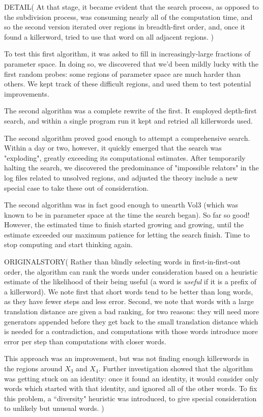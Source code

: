 \begin{itemize}
DETAIL(
At that stage, it became evident that the search process, as 
opposed to the subdivision process, 
was consuming nearly all of the computation time, and so the second 
version iterated over regions in breadth-first order, and, once it 
found a killerword, tried to use that word on all adjacent regions.
)

To test this first algorithm, it was asked to fill in increasingly-large fractions of parameter space. In doing so, we discovered that we'd been mildly lucky with the first random probes: some regions of parameter space are much harder than others. We kept track of these difficult regions, and used them to test potential improvements.

The second algorithm was a complete rewrite of the first. It employed depth-first search, and within a single program run it kept and retried all killerwords used.

The second algorithm proved good enough to attempt a comprehensive search. Within a day or two, however, it quickly emerged that the search was "exploding", greatly exceeding its computational estimates. After temporarily halting the search, we discovered the predominance of "impossible relators" in the log files related to unsolved regions, and adjusted the theory include a new special case to take these out of consideration.

The second algorithm was in fact good enough to unearth Vol3 (which was known to be in parameter space at the time the search began). So far so good! However, the estimated time to finish started growing and growing, until the estimate exceeded our maximum patience for letting the search finish. Time to stop computing and start thinking again.

ORIGINALSTORY(
Rather than blindly selecting words in first-in-first-out order, 
the algorithm can
rank the words under consideration based on a heuristic estimate of 
the likelihood of their being useful (a word is {\it useful} if it is a prefix of a killerword).  
We note first that short words tend to be better than 
long words, as they have fewer steps and less error.
Second, we note that words 
with a large translation distance are given a bad ranking, for two reasons: 
they will need more generators appended before they get back to the 
small translation distance which is needed for a contradiction, and
 computations with those words introduce more error per step than 
computations with closer words.  

This approach was an improvement, but was not finding enough killerwords in the regions 
around $X_3$ and $X_4$.  Further investigation showed that the 
algorithm was getting stuck on an identity: once it found an identity, 
it would consider only words which started with that identity, and 
ignored all of the other words.  To fix this problem, a ``diversity" 
heuristic was introduced, to give special consideration to unlikely but 
unusual words.
)


\end{itemize}
